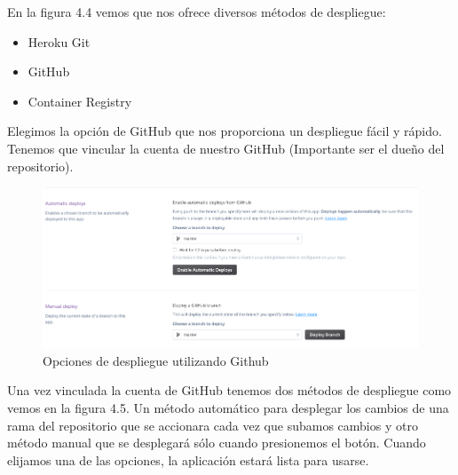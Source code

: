 En la figura 4.4 vemos que nos ofrece diversos métodos de despliegue:
\begin{itemize}
    \item Heroku Git
    \item GitHub
    \item Container Registry
\end{itemize}
Elegimos la opción de GitHub que nos proporciona un despliegue fácil y rápido. Tenemos que vincular la cuenta de nuestro GitHub (Importante ser el dueño del repositorio).
\begin{figure}[H]
    \centering
    \includegraphics[width=6in]{figures/chapter-4/heroku_4.png}
    \caption{Opciones de despliegue utilizando Github}
\end{figure}
Una vez vinculada la cuenta de GitHub tenemos dos métodos de despliegue como vemos en la figura 4.5. Un método automático para desplegar los cambios de una rama del repositorio que se accionara cada vez que subamos cambios y otro método manual que se desplegará sólo cuando presionemos el botón. 
Cuando elijamos una de las opciones, la aplicación estará lista para usarse.
